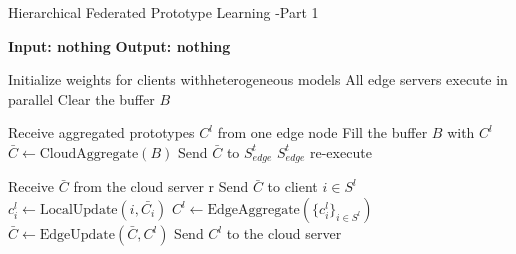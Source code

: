 \documentclass{article}
\begin{document}
\begin{algorithm}
    \caption{Hierarchical Federated Prototype Learning -Part 1}
    \begin{algorithmic}[1]
        \State \textbf{Input: nothing}
        \State \textbf{Output: nothing}

        \State Initialize weights for clients withheterogeneous models
        \State All edge servers execute in parallel
        \State Clear the buffer \(B\)

        \State Receive aggregated prototypes \( C^l \) from one edge node
        \State Fill the buffer \(B\) with \( C^l \)
        \EndWhile
        \State \( \bar{C} \gets \text{CloudAggregate}(B) \)
        \State Send \( \bar{C} \) to \( S_{edge}^t \)
        \State \( S_{edge}^t \) re-execute
        \EndFor
        \EndProcedure

        \State Receive \( \bar{C} \) from the cloud server
        r
        \State Send \( \bar{C} \) to client \( i \in S^{l} \)
        \State \( c^l_i \gets \text{LocalUpdate}(i, \bar{C_i}) \)
        \EndFor
        \State \( C^l \gets \text{EdgeAggregate}(\{ c^l_i \}_{i \in S^{l}}) \)
        \State \( \bar{C} \gets \text{EdgeUpdate}(\bar{C}, C^l) \)
        \EndFor
        \State Send \( C^l \) to the cloud server
        \EndProcedure
    \end{algorithmic}
\end{algorithm}

\newpage  %
\end{document}
